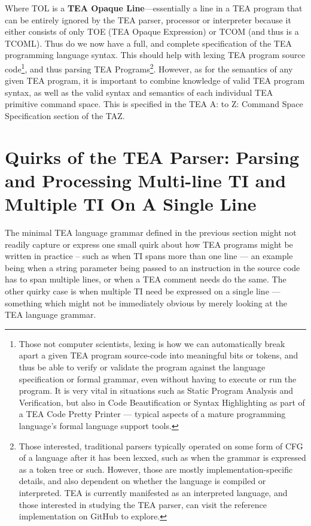 \documentclass[a4paper, 18pt]{book} %
\begin{document}
Where TOL is a \textbf{TEA Opaque Line}---essentially a line in a TEA program that can be entirely ignored by the TEA parser, processor or interpreter because it either consists of only TOE (TEA Opaque Expression) or TCOM (and thus is a TCOML). Thus do we now have a full, and complete specification of the TEA programming language syntax. This should help with lexing TEA program source code\footnote{Those not computer scientists, lexing is how we can automatically break apart a given TEA program source-code into meaningful bits or tokens, and thus be able to verify or validate the program against the language specification or formal grammar, even without having to execute or run the program. It is very vital in situations such as Static Program Analysis and Verification, but also in Code Beautification or Syntax Highlighting as part of a TEA Code Pretty Printer --- typical aspects of a mature programming language's formal language support tools.}, and thus parsing TEA Programs\footnote{Those interested, traditional parsers typically operated on some form of CFG of a language after it has been lexxed, such as when the grammar is expressed as a token tree or such. However, those are mostly implementation-specific details, and also dependent on whether the language is compiled or interpreted. TEA is currently manifested as an interpreted language, and those interested in studying the TEA parser, can visit the reference implementation on GitHub\cite{cli_tttt} to explore.}. However, as for the semantics of any given TEA program, it is important to combine knowledge of valid TEA program syntax, as well as the valid syntax and semantics of each individual TEA primitive command space. This is specified in the TEA A: to Z: Command Space Specification section of the TAZ.

\section{Quirks of the TEA Parser: Parsing and Processing Multi-line TI and Multiple TI On A Single Line}
\label{SECPARSE}

The minimal TEA language grammar defined in the previous section might not readily capture or express one small quirk about how TEA programs might be written in practice – such as when TI spans more than one line --– an example being when a string parameter being passed to an instruction in the source code has to span multiple lines, or when a TEA comment needs do the same. The other quirky case is when multiple TI need be expressed on a single line –-- something which might not be immediately obvious by merely looking at the TEA language grammar.
\end{document}
